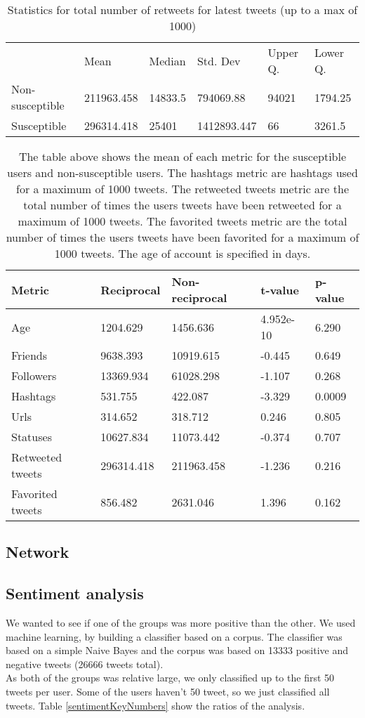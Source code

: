 \documentclass[10pt]{IEEEtran}
\begin{document}
\begin{table}[ht]
\begin{tabular}{llllll}
\textbf{}       & Mean       & Median  & Std. Dev    & Upper Q. & Lower Q. \\
Non-susceptible & 211963.458 & 14833.5 & 794069.88   & 94021    & 1794.25  \\
Susceptible     & 296314.418 & 25401   & 1412893.447 & 66       & 3261.5  
\end{tabular}
\caption{Statistics for total number of retweets for latest tweets (up to a max of 1000)}
\end{table}

\begin{table}[ht]
\centering
\begin{tabular}{lllll}
\hline
Metric & Reciprocal & Non-reciprocal & t-value & p-value \\ \hline
Age & 1204.629 & 1456.636 & 4.952e-10 & 6.290 \\
Friends & 9638.393 & 10919.615 & -0.445 & 0.649 \\
Followers & 13369.934 & 61028.298 & -1.107 & 0.268 \\
Hashtags & 531.755 & 422.087 & -3.329 & 0.0009 \\
Urls & 314.652 & 318.712 & 0.246 & 0.805 \\
Statuses & 10627.834 & 11073.442 & -0.374 & 0.707 \\
Retweeted tweets & 296314.418 & 211963.458 & -1.236 & 0.216 \\
Favorited tweets & 856.482 & 2631.046 & 1.396 & 0.162 \\ \hline
\end{tabular}
\caption{The table above shows the mean of each metric for the susceptible users and non-susceptible users. The hashtags metric are hashtags used for a maximum of 1000 tweets. The retweeted tweets metric are the total number of times the users tweets have been retweeted for a maximum of 1000 tweets. The favorited tweets metric are the total number of times the users tweets have been favorited for a maximum of 1000 tweets. The age of account is specified in days.}
\end{table}

\subsection{Network}
\subsection{Sentiment analysis}
We wanted to see if one of the groups was more positive than the other. We used machine learning, by building a classifier based on a corpus. The classifier was based on a simple Naive Bayes and the corpus was based on 13333 positive and negative tweets (26666 tweets total). \\
As both of the groups was relative large, we only classified up to the first 50 tweets per user. Some of the users haven't 50 tweet, so we just classified all tweets. 
Table \ref{sentimentKeyNumbers} show the ratios of the analysis. 
\end{document}
